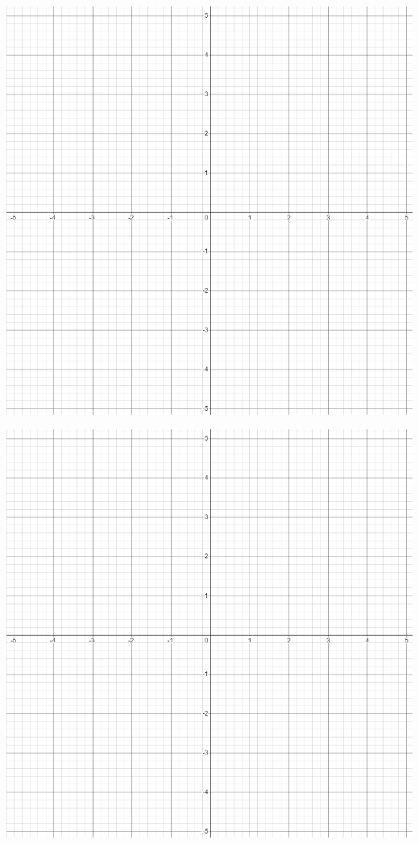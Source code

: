 \documentclass[12pt]{report}
\begin{document}
\begin{minipage}{0.48\textwidth}
     \centering
     \includegraphics[width=.9\linewidth]{emptyplot.png}
   \end{minipage}\hfill
   \begin{minipage}{0.48\textwidth}
     \centering
     \includegraphics[width=.9\linewidth]{emptyplot.png}
   \end{minipage}
\end{document}
